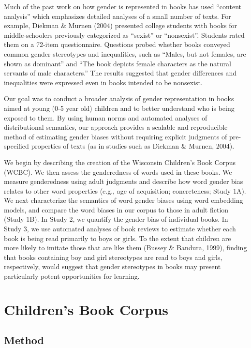 \documentclass[
  english,
  ,man,floatsintext]{apa6}
\begin{document}
Much of the past work on how gender is represented in books has used \enquote{content analysis} which emphasizes detailed analyses of a small number of texts. For example, Diekman \& Murnen (2004) presented college students with books for middle-schoolers previously categorized as \enquote{sexist} or \enquote{nonsexist}. Students rated them on a 72-item questionnaire. Questions probed whether books conveyed common gender stereotypes and inequalities, such as \enquote{Males, but not females, are shown as dominant} and \enquote{The book depicts female characters as the natural servants of male characters.} The results suggested that gender differences and inequalities were expressed even in books intended to be nonsexist.

Our goal was to conduct a broader analysis of gender representation in books aimed at young (0-5 year old) children and to better understand who is being exposed to them. By using human norms and automated analyses of distributional semantics, our approach provides a scalable and reproducible method of estimating gender biases without requiring explicit judgments of pre-specified properties of texts (as in studies such as Diekman \& Murnen, 2004).

We begin by describing the creation of the Wisconsin Children's Book Corpus (WCBC). We then assess the genderedness of words used in these books. We measure genderedness using adult judgments and describe how word gender bias relates to other word properties (e.g., age of acquisition; concreteness; Study 1A). We next characterize the semantics of word gender biases using word embedding models, and compare the word biases in our corpus to those in adult fiction (Study 1B). In Study 2, we quantify the gender bias of individual books. In Study 3, we use automated analyses of book reviews to estimate whether each book is being read primarily to boys or girls. To the extent that children are more likely to imitate those that are like them (Bussey \& Bandura, 1999), finding that books containing boy and girl stereotypes are read to boys and girls, respectively, would suggest that gender stereotypes in books may present particularly potent opportunities for learning.

\hypertarget{childrens-book-corpus}{%
\section{Children's Book Corpus}\label{childrens-book-corpus}}

\hypertarget{method}{%
\subsection{Method}\label{method}}
\end{document}
